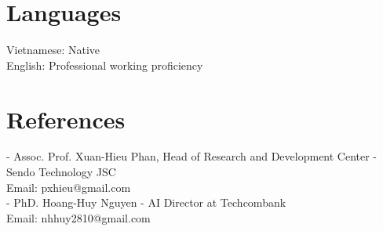 \documentclass[10pt, letterpaper]{article}
\begin{document}
\section{Languages}
Vietnamese: Native \\
English: Professional working proficiency

\section{References}
- Assoc. Prof. Xuan-Hieu Phan, Head of Research and Development Center - Sendo Technology JSC \\
Email: pxhieu@gmail.com \\

- PhD. Hoang-Huy Nguyen - AI Director at Techcombank \\
Email: nhhuy2810@gmail.com \\
\end{document}
